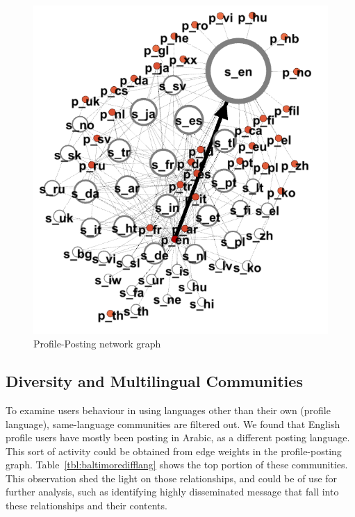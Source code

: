 \begin{figure}[htb]
\centering
\includegraphics[width=\columnwidth]{images/baltimore_p_s_lang_sl.png}
\caption{Profile-Posting network graph}
\label{fig:baltimore_p_s_lang_sl}
\end{figure}


\subsection{Diversity and Multilingual Communities}

To examine users behaviour in using languages other than their own
(profile language), same-language communities are filtered out.  We
found that English profile users have mostly been posting in Arabic,
as a different posting language. This sort of activity could be
obtained from edge weights in the profile-posting
graph. Table~\ref{tbl:baltimoredifflang} shows the top portion of
these communities. This observation shed the light on those
relationships, and could be of use for further analysis, such as
identifying highly disseminated message that fall into these
relationships and their contents.

